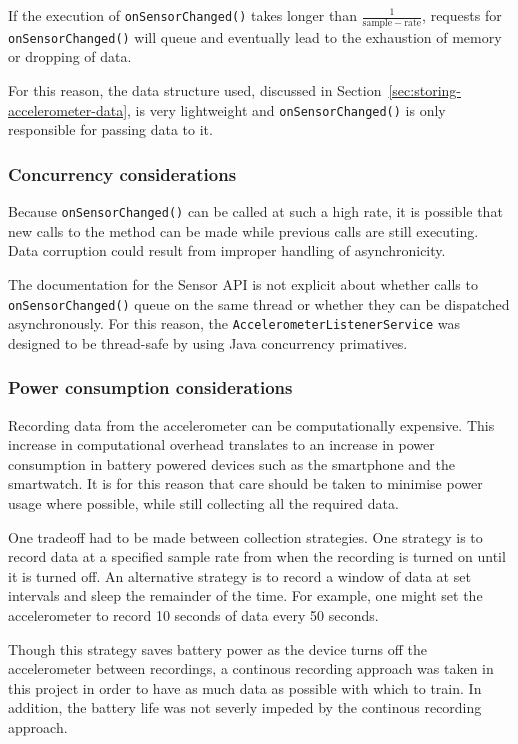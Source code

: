         If the execution of \texttt{onSensorChanged()} takes longer than $\frac{1}{\mathrm{sample-rate}}$, requests for \texttt{onSensorChanged()} will queue and eventually lead to the exhaustion of memory or dropping of data.
        
        For this reason, the data structure used, discussed in Section~\ref{sec:storing-accelerometer-data}, is very lightweight and \texttt{onSensorChanged()} is only responsible for passing data to it.
      
      \subsubsection{Concurrency considerations}
        Because \texttt{onSensorChanged()} can be called at such a high rate, it is possible that new calls to the method can be made while previous calls are still executing. Data corruption could result from improper handling of asynchronicity.
      
        The documentation for the Sensor API is not explicit about whether calls to \texttt{onSensorChanged()} queue on the same thread or whether they can be dispatched asynchronously. For this reason, the \texttt{AccelerometerListenerService} was designed to be thread-safe by using Java concurrency primatives.
      
      \subsubsection{Power consumption considerations}
        Recording data from the accelerometer can be computationally expensive. This increase in computational overhead translates to an increase in power consumption in battery powered devices such as the smartphone and the smartwatch. It is for this reason that care should be taken to minimise power usage where possible, while still collecting all the required data.
        
        One tradeoff had to be made between collection strategies. One strategy is to record data at a specified sample rate from when the recording is turned on until it is turned off. An alternative strategy is to record a window of data at set intervals and sleep the remainder of the time. For example, one might set the accelerometer to record 10 seconds of data every 50 seconds.
        
        Though this strategy saves battery power as the device turns off the accelerometer between recordings, a continous recording approach was taken in this project in order to have as much data as possible with which to train. In addition, the battery life was not severly impeded by the continous recording approach.
        
